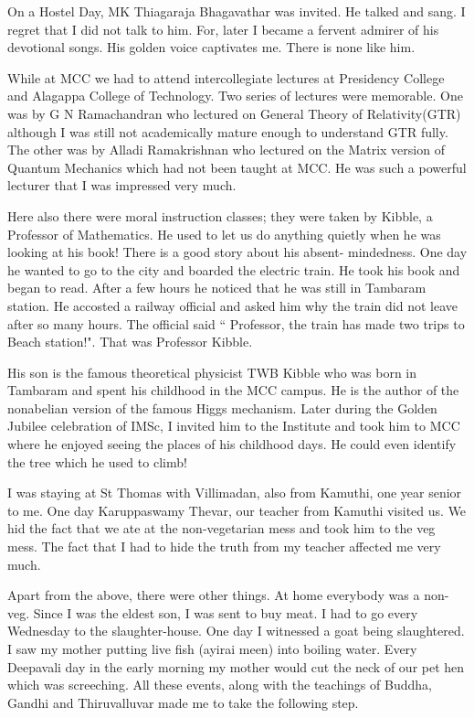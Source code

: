 On a Hostel Day, MK Thiagaraja Bhagavathar was invited. He talked and 
sang. I regret that I did not talk to him. For, later I became a fervent 
admirer of his devotional songs. His golden voice captivates me. There 
is none like him.

While at MCC we had to attend intercollegiate lectures at Presidency 
College and Alagappa College of Technology. Two series of lectures were 
memorable. One was by G N Ramachandran who lectured on General Theory of 
Relativity(GTR) although I was still not academically mature enough to 
understand GTR fully. The other was by Alladi Ramakrishnan who lectured 
on the Matrix version of Quantum Mechanics which had not been taught at 
MCC. He was such a powerful lecturer that I was impressed very much.

Here also there were moral instruction classes; they were taken by 
Kibble, a Professor of Mathematics. He used to let us do anything 
quietly when he was looking at his book! There is a good story about his 
absent- mindedness. One day he wanted to go to the city and boarded the 
electric train. He took his book and began to read. After a few hours he 
noticed that he was still in Tambaram station. He accosted a railway 
official and asked him why the train did not leave after so many hours. 
The official said `` Professor, the train has made two trips to Beach 
station!". That was Professor Kibble.
 
His son is the famous theoretical physicist TWB Kibble who was born in 
Tambaram and spent his childhood in the MCC campus. He is the author of 
the nonabelian version of the famous Higgs mechanism. Later during the 
Golden Jubilee celebration of IMSc, I invited him to the Institute and 
took him to MCC where he enjoyed seeing the places of his childhood 
days. He could even identify the tree which he used to climb!
  
I was staying at St Thomas with Villimadan, also from Kamuthi, one year 
senior to me. One day Karuppaswamy Thevar, our teacher from Kamuthi 
visited us. We hid the fact that we ate at the non-vegetarian mess and 
took him to the veg mess. The fact that I had to hide the truth from my 
teacher affected me very much.

Apart from the above, there were other things. At home everybody was a 
non-veg. Since I was the eldest son, I was sent to buy meat. I had to go 
every Wednesday to the slaughter-house. One day I witnessed a goat being 
slaughtered. I saw my mother putting live fish (ayirai meen) into 
boiling water. Every Deepavali day in the early morning my mother would 
cut the neck of our pet hen which was screeching. All these events, 
along with the teachings of Buddha, Gandhi and Thiruvalluvar made me to 
take the following step.

